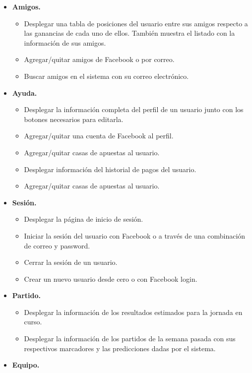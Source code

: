 \begin{itemize}
\begin{itemize}
			\end{itemize}
			\item \textbf{Amigos.}
			\begin{itemize}
				\item Desplegar una tabla de posiciones del usuario entre sus amigos respecto a las ganancias de cada uno de ellos. También muestra el listado con la información de sus amigos.
				\item Agregar/quitar amigos de Facebook \cite{facebookDocuWeb} o por correo.
				\item Buscar amigos en el sistema con su correo electrónico.
			\end{itemize}
			\item \textbf{Ayuda.}
			\begin{itemize}
				\item Desplegar la información completa del perfil de un usuario junto con los botones necesarios para editarla.
				\item Agregar/quitar una cuenta de Facebook \cite{facebookDocuWeb} al perfil.
				\item Agregar/quitar casas de apuestas al usuario.
 				\item Desplegar información del historial de pagos del usuario.
				\item Agregar/quitar casas de apuestas al usuario.
			\end{itemize}
			\item \textbf{Sesión.}
			\begin{itemize}
				\item Desplegar la página de inicio de sesión.
				\item Iniciar la sesión del usuario con Facebook o a través de una combinación de correo y password.
				\item Cerrar la sesión de un usuario.
 				\item Crear un nuevo usuario desde cero o con Facebook \cite{facebookDocuWeb} login.
			\end{itemize}
			\item \textbf{Partido.}
			\begin{itemize}
				\item Desplegar la información de los resultados estimados para la jornada en curso.
				\item Desplegar la información de los partidos de la semana pasada con sus respectivos marcadores y las predicciones dadas por el sistema.
			\end{itemize}
			\item \textbf{Equipo.}

\end{itemize}
